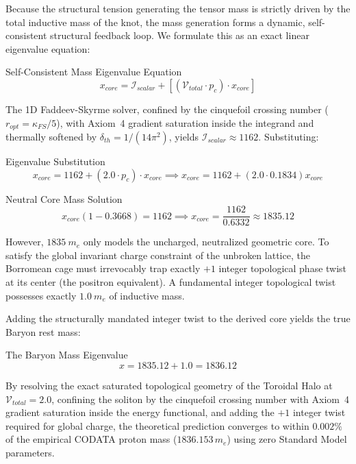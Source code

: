 Because the structural tension generating the tensor mass is strictly driven by the total inductive mass of the knot, the mass generation forms a dynamic, self-consistent structural feedback loop. We formulate this as an exact linear eigenvalue equation:
\begin{resultbox}{Self-Consistent Mass Eigenvalue Equation}
\begin{equation}
x_{core} = \mathcal{I}_{scalar} + \left[ (\mathcal{V}_{total} \cdot p_c) \cdot x_{core} \right]
\end{equation}
\end{resultbox}

The 1D Faddeev-Skyrme solver, confined by the cinquefoil crossing number ($r_{opt} = \kappa_{FS}/5$), with Axiom~4 gradient saturation inside the integrand and thermally softened by $\delta_{th} = 1/(14\pi^2)$, yields $\mathcal{I}_{scalar} \approx 1162$. Substituting:
\begin{resultbox}{Eigenvalue Substitution}
\begin{equation}
x_{core} = 1162 + (2.0 \cdot p_c) \cdot x_{core} \implies x_{core} = 1162 + (2.0 \cdot 0.1834) x_{core}
\end{equation}
\end{resultbox}
\begin{resultbox}{Neutral Core Mass Solution}
\begin{equation}
x_{core}(1 - 0.3668) = 1162 \implies x_{core} = \frac{1162}{0.6332} \approx \mathbf{1835.12}
\end{equation}
\end{resultbox}

However, $1835\ m_e$ only models the uncharged, neutralized geometric core. To satisfy the global invariant charge constraint of the unbroken lattice, the Borromean cage must irrevocably trap exactly $+1$ integer topological phase twist at its center (the positron equivalent). A fundamental integer topological twist possesses exactly $1.0\ m_e$ of inductive mass. 

Adding the structurally mandated integer twist to the derived core yields the true Baryon rest mass:
\begin{resultbox}{The Baryon Mass Eigenvalue}
\begin{equation}
x = 1835.12 + 1.0 = \mathbf{1836.12}
\end{equation}
\end{resultbox}

By resolving the exact saturated topological geometry of the Toroidal Halo at $\mathcal{V}_{total}=2.0$, confining the soliton by the cinquefoil crossing number with Axiom~4 gradient saturation inside the energy functional, and adding the $+1$ integer twist required for global charge, the theoretical prediction converges to within $\mathbf{0.002\%}$ of the empirical CODATA proton mass ($1836.153\,m_e$) using zero Standard Model parameters.


